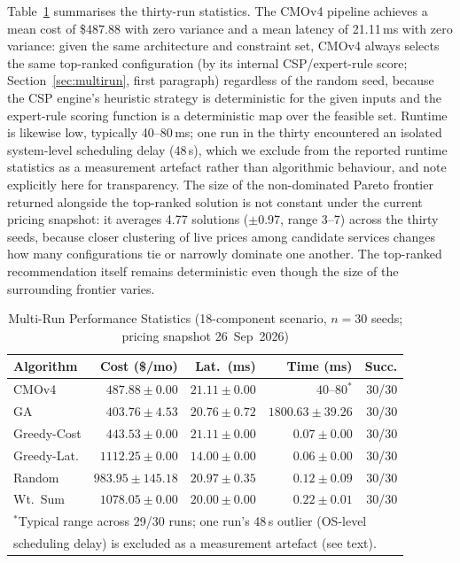 \documentclass[journal]{IEEEtran}
\newcommand{\cmofour}{CMOv4\xspace}
\begin{document}
Table~\ref{tab:multirun} summarises the thirty-run statistics. The \cmofour
pipeline achieves a mean cost of \$487.88 with zero variance and a mean
latency of 21.11\,ms with zero variance: given the same architecture and
constraint set, \cmofour always selects the same top-ranked configuration
(by its internal CSP/expert-rule score; Section~\ref{sec:multirun}, first
paragraph) regardless of the random seed, because the CSP engine's heuristic
strategy is deterministic for the given inputs and the expert-rule scoring
function is a deterministic map over the feasible set. Runtime is likewise
low, typically 40--80\,ms; one run in the thirty encountered an isolated
system-level scheduling delay (48\,s), which we exclude from the reported
runtime statistics as a measurement artefact rather than algorithmic
behaviour, and note explicitly here for transparency. The size of the
non-dominated Pareto frontier returned alongside the top-ranked solution is
not constant under the current pricing snapshot: it averages 4.77 solutions
($\pm$0.97, range 3--7) across the thirty seeds, because closer clustering of
live prices among candidate services changes how many configurations tie or
narrowly dominate one another. The top-ranked recommendation itself remains
deterministic even though the size of the surrounding frontier varies.

\begin{table}[t]
\centering
\caption{Multi-Run Performance Statistics (18-component scenario, $n = 30$ seeds; pricing snapshot 26~Sep~2026)}
\label{tab:multirun}
\footnotesize
\setlength{\tabcolsep}{3pt}
\begin{tabular}{@{}lrrrr@{}}
\toprule
Algorithm    & Cost (\$/mo)          & Lat.\ (ms)        & Time (ms)              & Succ. \\
\midrule
\cmofour     & $487.88 \pm 0.00$     & $21.11 \pm 0.00$  & $40$--$80^{*}$         & 30/30 \\
GA           & $403.76 \pm 4.53$     & $20.76 \pm 0.72$  & $1800.63 \pm 39.26$    & 30/30 \\
Greedy-Cost  & $443.53 \pm 0.00$     & $21.11 \pm 0.00$  & $0.07 \pm 0.00$        & 30/30 \\
Greedy-Lat.  & $1112.25 \pm 0.00$    & $14.00 \pm 0.00$  & $0.06 \pm 0.00$        & 30/30 \\
Random       & $983.95 \pm 145.18$   & $20.97 \pm 0.35$  & $0.12 \pm 0.09$        & 30/30 \\
Wt.\ Sum     & $1078.05 \pm 0.00$    & $20.00 \pm 0.00$  & $0.22 \pm 0.01$        & 30/30 \\
\bottomrule
\multicolumn{5}{l}{\footnotesize{$^{*}$Typical range across 29/30 runs; one run's 48\,s outlier (OS-level}}\\
\multicolumn{5}{l}{\footnotesize{scheduling delay) is excluded as a measurement artefact (see text).}}\\
\end{tabular}
\end{table}
\end{document}
